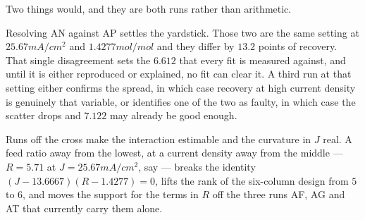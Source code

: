 Two things would, and they are both runs rather than arithmetic.

Resolving AN against AP settles the yardstick. Those two are the same setting at
$25.67\unit{mA/cm^2}$ and $1.4277\unit{mol/mol}$ and they differ by $13.2$ points of recovery.
That single disagreement sets the $6.612$ that every fit is measured against, and until it is
either reproduced or explained, no fit can clear it. A third run at that setting either confirms
the spread, in which case recovery at high current density is genuinely that variable, or
identifies one of the two as faulty, in which case the scatter drops and $7.122$ may already be
good enough.

Runs off the cross make the interaction estimable and the curvature in $J$ real. A feed ratio
away from the lowest, at a current density away from the middle --- $R = 5.71$ at
$J = 25.67\unit{mA/cm^2}$, say --- breaks the identity
$(J - 13.6667)(R - 1.4277) = 0$, lifts the rank of the six-column design from $5$ to $6$, and
moves the support for the terms in $R$ off the three runs AF, AG and AT that currently carry
them alone.
